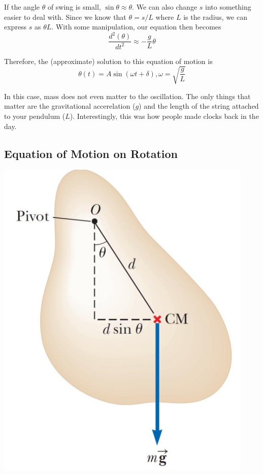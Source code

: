 If the angle $\theta$ of swing is small, $\sin\theta \approx \theta$. We can also change $s$ into 
something easier to deal with. Since we know that $\theta = s/L$ where $L$ is the radius, we can
express $s$ as $\theta L$. With some manipulation, our equation then becomes
\[ \frac{d^2(\theta)}{dt^2} \approx -\frac{g}{L}\theta \]

Therefore, the (approximate) solution to this equation of motion is
\[ \theta(t) = A\sin(\omega t + \delta), \omega = \sqrt{\frac{g}{L}} \]

In this case, mass does not even matter to the oscillation. The only things that matter are the 
gravitational accerelation ($g$) and the length of the string attached to your pendulum ($L$).
Interestingly, this was how people made clocks back in the day.

\subsection{Equation of Motion on Rotation}

\begin{center}
\includegraphics[scale=0.5]{images/oaw/rotation01.png}
\end{center}

